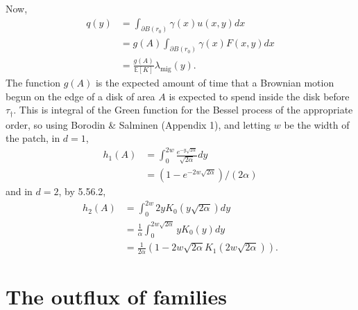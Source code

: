 \documentclass{article}
\newcommand{\E}{\mathbb{E}}
\newcommand{\one}{\mathbf{1}}
\newcommand{\migrate}{\lambda_\text{mig}}
\begin{document}
Now, 
\begin{align}
    q(y)  &= \int_{\partial B(r_0)} \gamma(x) u(x,y) dx  \\
          &= g(A) \int_{\partial B(r_0)} \gamma(x) F(x,y) dx \\
          &= \frac{ g(A) }{ \E[K] } \migrate(y) .
\end{align}
The function $g(A)$ is the expected amount of time that a Brownian motion begun on the edge of a disk of area $A$
is expected to spend inside the disk before $\tau_\dagger$.
This is integral of the Green function for the Bessel process of the appropriate order, 
so using Borodin \& Salminen (Appendix 1),
and letting $w$ be the width of the patch,
in $d=1$,
\begin{align}
    h_1(A) %
  &= \int_0^{2w} \frac{ e^{- y \sqrt{2\alpha} }}{\sqrt{2\alpha}} dy \\
  &= (1-e^{-2w\sqrt{2\alpha}})/(2\alpha)
\end{align}
and in $d=2$, by \citet{gradshteyn2007table} 5.56.2,
\begin{align}
    h_2(A) %
  &= \int_0^{2w} 2 y K_0(y \sqrt{2\alpha}) dy \\
  &= \frac{1}{\alpha}\int_0^{2w\sqrt{2\alpha}} y K_0(y) dy \\
  &= \frac{1}{2\alpha}\left(1- 2w\sqrt{2\alpha} K_1(2w\sqrt{2\alpha}) \right)  .
\end{align}




\section{The outflux of families}
\label{apx:outflux}
\end{document}
